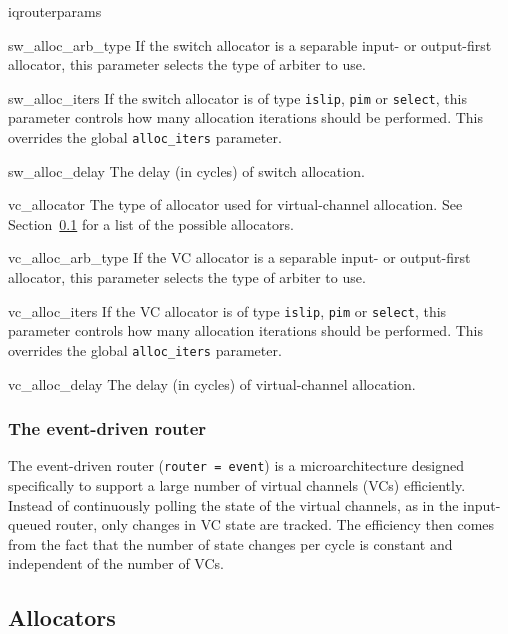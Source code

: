 \documentclass[11pt]{article}
\begin{document}
\begin{opt_list}{iqrouterparams}
\item[sw\_alloc\_arb\_type] If the switch allocator is a separable input- or output-first allocator, this parameter selects the type of arbiter to use.

\item[sw\_alloc\_iters] If the switch allocator is of type \texttt{islip}, \texttt{pim} or \texttt{select}, this parameter controls how many allocation iterations should be performed. This overrides the global \texttt{alloc\_iters} parameter.

\item[sw\_alloc\_delay] The delay (in cycles) of switch allocation.

\item[vc\_allocator] The type of allocator used for virtual-channel
allocation.  See Section~\ref{sec:alloc} for a list of the possible
allocators.

\item[vc\_alloc\_arb\_type] If the VC allocator is a separable input- or output-first allocator, this parameter selects the type of arbiter to use.

\item[vc\_alloc\_iters] If the VC allocator is of type \texttt{islip}, \texttt{pim} or \texttt{select}, this parameter controls how many allocation iterations should be performed. This overrides the global \texttt{alloc\_iters} parameter.

\item[vc\_alloc\_delay] The delay (in cycles) of virtual-channel
allocation.

\end{opt_list}

\subsubsection{The event-driven router}
\label{sec:event_router}

The event-driven router (\texttt{router = event}) is a
microarchitecture designed specifically to support a large number of
virtual channels (VCs) efficiently.  Instead of continuously polling
the state of the virtual channels, as in the input-queued router, only
changes in VC state are tracked.  The efficiency then comes from the
fact that the number of state changes per cycle is constant and
independent of the number of VCs.

\subsection{Allocators}
\label{sec:alloc}
\end{document}
